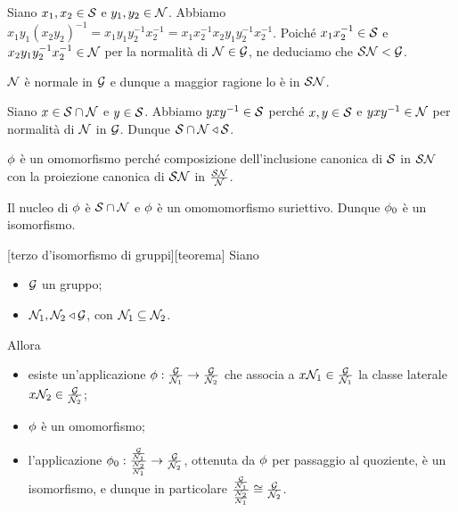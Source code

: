 \Proof
Siano $x_1, x_2 \in \mathcal{S}$ e $y_1, y_2 \in \mathcal{N}$.
Abbiamo
$x_1y_1(x_2y_2)^{-1} =
x_1y_1y_2^{-1}x_2^{-1} =
x_1x_2^{-1}x_2y_1y_2^{-1}x_2^{-1}$.
Poich\'e $x_1x_2^{-1} \in \mathcal{S}$ e
$x_2y_1y_2^{-1}x_2^{-1} \in \mathcal{N}$ per la normalit\`a
di $\mathcal{N} \in \mathcal{G}$, ne deduciamo che $\mathcal{S}\mathcal{N}
< \mathcal{G}$.
\par
$\mathcal{N}$ \`e normale in $\mathcal{G}$ e dunque a maggior ragione lo \`e
in $\mathcal{S}\mathcal{N}$.
\par
Siano $x \in \mathcal{S} \cap \mathcal{N}$ e $y \in \mathcal{S}$.
Abbiamo $yxy^{-1} \in \mathcal{S}$ perch\'e $x,y \in \mathcal{S}$ e
$yxy^{-1} \in \mathcal{N}$ per normalit\`a di $\mathcal{N}$ in
$\mathcal{G}$. Dunque $\mathcal{S} \cap \mathcal{N} \triangleleft \mathcal{S}$.
\par
$\phi$ \`e un omomorfismo perch\'e composizione dell'inclusione
canonica di $\mathcal{S}$ in $\mathcal{S}\mathcal{N}$ con la proiezione canonica
di $\mathcal{S}\mathcal{N}$ in
$\frac{\mathcal{S}\mathcal{N}}{\mathcal{N}}$.
\par
Il nucleo di $\phi$ \`e $\mathcal{S} \cap \mathcal{N}$ e
$\phi$ \`e un omomomorfismo suriettivo.
Dunque $\phi_0$ \`e un isomorfismo.
\EndProof
\begin{Theorem}
[terzo d'isomorfismo di gruppi][teorema]
	Siano
	\begin{itemize}
		\item
		$\mathcal{G}$ un gruppo;
		\item
		$\mathcal{N}_1,
		\mathcal{N}_2 \triangleleft \mathcal{G}$, con
		$\mathcal{N}_1 \subseteq \mathcal{N}_2$.
	\end{itemize}
	Allora
	\begin{itemize}
		\item
		esiste un'applicazione
		$\phi: \frac{\mathcal{G}}{\mathcal{N}_1}
		\rightarrow \frac{\mathcal{G}}{\mathcal{N}_2}$
		che associa a
		$x\mathcal{N}_1 \in
		\frac{\mathcal{G}}{\mathcal{N}_1}$
		la classe laterale
		$x\mathcal{N}_2 \in
		\frac{\mathcal{G}}{\mathcal{N}_2}$;
		\item
		$\phi$ \`e un omomorfismo;
		\item l'applicazione
		$\phi_0:
		\frac{\frac{\mathcal{G}}{\mathcal{N}_1}}{\frac{\mathcal{N}_2}{\mathcal{N}_1}}
		\rightarrow \frac{\mathcal{G}}{\mathcal{N}_2}$,
		ottenuta da $\phi$ per passaggio al quoziente,
		\`e un isomorfismo, e dunque in particolare
		$\frac{\frac{\mathcal{G}}{\mathcal{N}_1}}{\frac{\mathcal{N}_2}{\mathcal{N}_1}} \cong \frac{\mathcal{G}}{\mathcal{N}_2}$.
	\end{itemize}
\end{Theorem}
